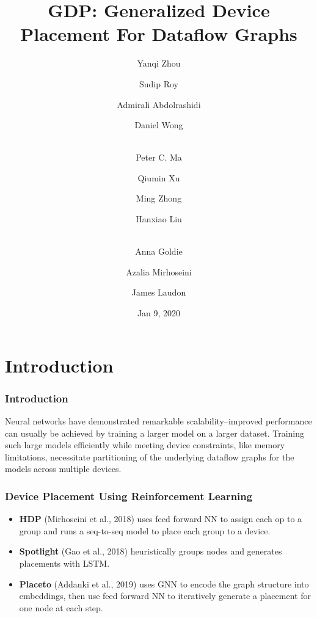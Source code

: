 \documentclass[12pt,aspectratio=169]{beamer}
\title{GDP: Generalized Device Placement For Dataflow Graphs}
\author{Yanqi Zhou \and %
        Sudip Roy \and %
        Admirali Abdolrashidi \and %
        Daniel Wong \and \\ %
        Peter C. Ma \and %
        Qiumin Xu \and %
        Ming Zhong \and %
        Hanxiao Liu \and \\ %
        Anna Goldie \and %
        Azalia Mirhoseini \and %
        James Laudon}%
\institute{Google Brain}
\date{Jan 9, 2020}
\begin{document}
    \beamertemplatenavigationsymbolsempty
    
    \begin{frame}
        \titlepage
    \end{frame}

    \section{Introduction}

    \begin{frame}
        \frametitle{Introduction}

        Neural networks have demonstrated remarkable scalability–improved performance can usually be achieved by training a
        larger model on a larger dataset. Training such large models efficiently while meeting device constraints, like
        memory limitations, necessitate partitioning of the underlying dataflow graphs for the models across multiple
        devices.
    \end{frame}

    \begin{frame}
        \frametitle{Device Placement Using Reinforcement Learning}

        \begin{itemize}
            \setlength{\itemsep}{1.4em}
            \item \textbf{HDP} (Mirhoseini et al., 2018) uses feed forward NN to assign each op to a group and runs a
                  seq-to-seq model to place each group to a device.
            \item \textbf{Spotlight} (Gao et al., 2018) heuristically groups nodes and generates placements with LSTM.
            \item \textbf{Placeto} (Addanki et al., 2019) uses GNN to encode the graph structure into embeddings, then
                  use feed forward NN to iteratively generate a placement for one node at each step.
        \end{itemize}
    \end{frame}
\end{document}
